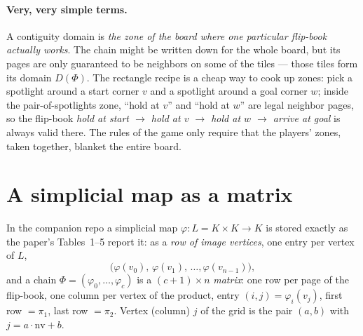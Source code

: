 \documentclass[11pt]{article}
\theoremstyle{definition}
\begin{document}
\paragraph{Very, very simple terms.}
A contiguity domain is \emph{the zone of the board where one particular
flip-book actually works}. The chain might be written down for the whole
board, but its pages are only guaranteed to be neighbors on some of the tiles
--- those tiles form its domain $D(\Phi)$. The rectangle recipe is a cheap way
to cook up zones: pick a spotlight around a start corner $v$ and a spotlight
around a goal corner $w$; inside the pair-of-spotlights zone, ``hold at $v$''
and ``hold at $w$'' are legal neighbor pages, so the flip-book
\emph{hold at start $\to$ hold at $v$ $\to$ hold at $w$ $\to$ arrive at goal}
is always valid there. The rules of the game only require that the players'
zones, taken together, blanket the entire board.

\section{A simplicial map as a matrix}
\label{sec:matrix}

In the companion repo a simplicial map $\varphi : L = K\times K \to K$ is
stored exactly as the paper's Tables~1--5 report it: as a \emph{row of image
vertices}, one entry per vertex of $L$,
\[
\bigl(\varphi(v_0),\, \varphi(v_1),\, \dots, \varphi(v_{n-1})\bigr),
\]
and a chain $\Phi = (\varphi_0, \dots, \varphi_c)$ is a
$(c{+}1) \times n$ \emph{matrix}: one row per page of the flip-book, one column
per vertex of the product, entry $(i,j) = \varphi_i(v_j)$, first row $=\pi_1$,
last row $=\pi_2$. Vertex (column) $j$ of the grid is the pair
$(a,b)$ with $j = a\cdot\mathrm{nv} + b$.
\end{document}
